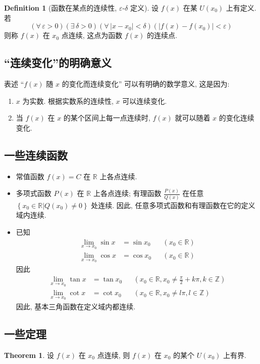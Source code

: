 \documentclass{book}
\newcommand{\Exists}{\exists\,}
\newcommand{\Any}{\forall\,}
\newcommand{\set}[1]{\left\{#1\right\}}
\newcommand{\abs}[1]{\left\lvert #1 \right\rvert}
\newcommand{\R}{\mathbb{R}}
\newcommand{\Z}{\mathbb{Z}}
\renewcommand{\U}[1]{U\!\left( #1 \right)}%
\numberwithin{equation}{section}
\numberwithin{figure}{section}
\theoremstyle{definition}
\newtheorem{definition}{Definition}
\newtheorem{theorem}{Theorem}[section]
\newcommand{\dq}[1]{``#1''}
\begin{document}
\begin{definition}[函数在某点的连续性, $\varepsilon$-$\delta$ 定义]
  设 $f(x)$ 在某 $\U{x_0}$ 上有定义. 若
  \begin{equation*}
    (\Any \varepsilon>0)(\Exists \delta>0)(\Any \abs{x-x_0}<\delta)(\abs{f(x)-f(x_0)}<\varepsilon)
  \end{equation*}
  则称 $f(x)$ 在 $x_0$ 点连续, 这点为函数 $f(x)$ 的连续点.
\end{definition}

\subsection{\dq{连续变化}的明确意义}
表述 ``$f(x)$ 随 $x$ 的变化而连续变化'' 可以有明确的数学意义, 这是因为:
\begin{enumerate}
  \item $x$ 为实数. 根据实数系的连续性, $x$ 可以连续变化.
  \item 当 $f(x)$ 在 $x$ 的某个区间上每一点连续时, $f(x)$ 就可以随着 $x$ 的变化连续变化.
\end{enumerate}
\subsection{一些连续函数}
\begin{itemize}
  \item 常值函数 $f(x)=C$ 在 $\R$ 上各点连续.
  \item 多项式函数 $P(x)$ 在 $\R$ 上各点连续; 有理函数 $\frac{P(x)}{Q(x)}$ 在任意 $\set{x_0\in\R|Q(x_0)\ne0}$ 处连续. 因此, 任意多项式函数和有理函数在它的定义域内连续.
  \item 已知
    \begin{align*}
      \lim_{x\to x_0}\sin x&=\sin x_0&&(x_0\in\R)\\
      \lim_{x\to x_0}\cos x&=\cos x_0&&(x_0\in\R)
    \end{align*}
    因此
    \begin{align*}
      \lim_{x\to x_0}\tan x&=\tan x_0&&(x_0\in\R,x_0\ne\frac{\pi}{2}+k\pi,k\in\Z)\\
      \lim_{x\to x_0}\cot x&=\cot x_0&&(x_0\in\R,x_0\ne l\pi,l\in\Z)
    \end{align*}
    因此, 基本三角函数在定义域内都连续.
\end{itemize}

\subsection{一些定理}
\begin{theorem}
  设 $f(x)$ 在 $x_0$ 点连续, 则 $f(x)$ 在 $x_0$ 的某个 $\U{x_0}$ 上有界.
\end{theorem}
\end{document}
